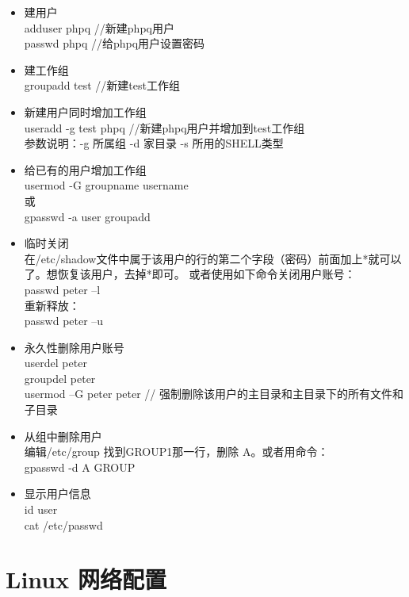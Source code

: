 \begin{itemize}
\item{建用户}\\
adduser phpq    //新建phpq用户\\
passwd phpq     //给phpq用户设置密码


\item{建工作组}\\
groupadd test				//新建test工作组


\item{新建用户同时增加工作组}\\
useradd -g test phpq		//新建phpq用户并增加到test工作组\\
参数说明：-g 所属组 -d 家目录 -s 所用的SHELL类型


\item{给已有的用户增加工作组}\\
usermod -G groupname username\\
或\\
gpasswd -a user groupadd


\item{临时关闭}\\
在/etc/shadow文件中属于该用户的行的第二个字段（密码）前面加上*就可以了。想恢复该用户，去掉*即可。
或者使用如下命令关闭用户账号：\\
passwd peter –l\\
重新释放：\\
passwd peter –u


\item{永久性删除用户账号}\\
userdel peter\\
groupdel peter\\
usermod –G peter peter   // 强制删除该用户的主目录和主目录下的所有文件和子目录


\item{从组中删除用户}\\
编辑/etc/group 找到GROUP1那一行，删除 A。或者用命令：\\
gpasswd -d A GROUP


\item{显示用户信息}\\
id user\\
cat /etc/passwd
\end{itemize}









\chapter{Linux 网络配置}

